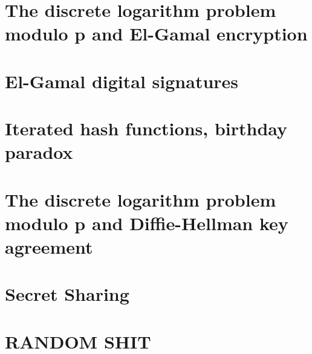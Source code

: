 \documentclass{article}
\begin{document}
\section{The discrete logarithm problem modulo p and El-Gamal encryption}

\clearpage

\section{El-Gamal digital signatures}

\clearpage

\section{Iterated hash functions, birthday paradox}

\clearpage

\section{The discrete logarithm problem modulo p and Diffie-Hellman key agreement}

\clearpage

\section{Secret Sharing}

\clearpage

\section{RANDOM SHIT}

\end{document}
